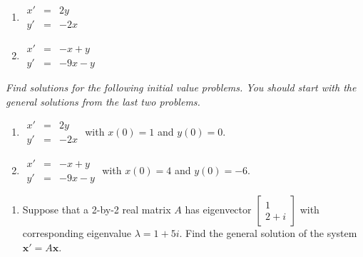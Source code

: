\documentclass[10pt]{article}
\begin{document}
\begin{multicols}{2}
\begin{enumerate}
\setcounter{enumi}{\theenumCount}

\item $\begin{array}{ccc} x' & = & 2y \\ y' & = & -2x \end{array}$

\item $\begin{array}{ccc} x' & = & -x + y \\ y' & = & -9x - y \end{array}$

\setcounter{enumCount}{\theenumi}
\end{enumerate} 
\end{multicols}
\vfill
\vfill

\noindent
\textit{Find solutions for the following initial value problems. You should start with the general solutions from the last two problems. }

\begin{multicols}{2}
\begin{enumerate}
\setcounter{enumi}{\theenumCount}

\item $\begin{array}{ccc} x' & = & 2y \\ y' & = & -2x \end{array}$ with $x(0) = 1$ and $y(0) = 0$. 

\item $\begin{array}{ccc} x' & = & -x + y \\ y' & = & -9x - y \end{array}$ with $x(0) = 4$ and $y(0) = -6$. 

\setcounter{enumCount}{\theenumi}
\end{enumerate} 
\end{multicols}
\vfill
\vfill

\begin{enumerate}
\setcounter{enumi}{\theenumCount}
\item Suppose that a 2-by-2 real matrix $A$ has eigenvector $\begin{bmatrix} 1 \\ 2 + i \end{bmatrix}$ with corresponding eigenvalue $\lambda = 1 + 5i$. Find the general solution of the system $\mathbf{x}' = A \mathbf{x}$. 
\vfill
\vfill

\setcounter{enumCount}{\theenumi}
\end{enumerate} 
\end{document}
